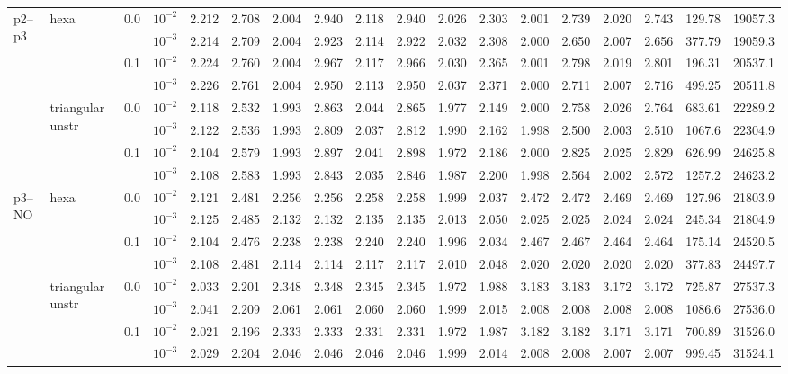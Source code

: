 \begin{longtable}{llclrrrrrrrrrrrrrr}
\multirow{8}{*}{p2--p3} & \multirow{4}{*}{hexa} & \multirow{2}{*}{0.0} & $10^{-2}$ & 2.212 & 2.708 & 2.004 & 2.940 & 2.118 & 2.940 & 2.026 & 2.303 & 2.001 & 2.739 & 2.020 & 2.743 & 129.78 & 19057.3 \\
& & & $10^{-3}$ & 2.214 & 2.709 & 2.004 & 2.923 & 2.114 & 2.922 & 2.032 & 2.308 & 2.000 & 2.650 & 2.007 & 2.656 & 377.79 & 19059.3 \\\cline{3-18}
& & \multirow{2}{*}{0.1} & $10^{-2}$ & 2.224 & 2.760 & 2.004 & 2.967 & 2.117 & 2.966 & 2.030 & 2.365 & 2.001 & 2.798 & 2.019 & 2.801 & 196.31 & 20537.1 \\
& & & $10^{-3}$ & 2.226 & 2.761 & 2.004 & 2.950 & 2.113 & 2.950 & 2.037 & 2.371 & 2.000 & 2.711 & 2.007 & 2.716 & 499.25 & 20511.8 \\\cline{2-18}
& \multirow{4}{*}{triangular unstr} & \multirow{2}{*}{0.0} & $10^{-2}$ & 2.118 & 2.532 & 1.993 & 2.863 & 2.044 & 2.865 & 1.977 & 2.149 & 2.000 & 2.758 & 2.026 & 2.764 & 683.61 & 22289.2 \\
& & & $10^{-3}$ & 2.122 & 2.536 & 1.993 & 2.809 & 2.037 & 2.812 & 1.990 & 2.162 & 1.998 & 2.500 & 2.003 & 2.510 & 1067.6 & 22304.9 \\\cline{3-18}
& & \multirow{2}{*}{0.1} & $10^{-2}$ & 2.104 & 2.579 & 1.993 & 2.897 & 2.041 & 2.898 & 1.972 & 2.186 & 2.000 & 2.825 & 2.025 & 2.829 & 626.99 & 24625.8 \\
& & & $10^{-3}$ & 2.108 & 2.583 & 1.993 & 2.843 & 2.035 & 2.846 & 1.987 & 2.200 & 1.998 & 2.564 & 2.002 & 2.572 & 1257.2 & 24623.2 \\\hline

\multirow{8}{*}{p3--NO} & \multirow{4}{*}{hexa} & \multirow{2}{*}{0.0} & $10^{-2}$ & 2.121 & 2.481 & 2.256 & 2.256 & 2.258 & 2.258 & 1.999 & 2.037 & 2.472 & 2.472 & 2.469 & 2.469 & 127.96 & 21803.9 \\
& & & $10^{-3}$ & 2.125 & 2.485 & 2.132 & 2.132 & 2.135 & 2.135 & 2.013 & 2.050 & 2.025 & 2.025 & 2.024 & 2.024 & 245.34 & 21804.9 \\\cline{3-18}
& & \multirow{2}{*}{0.1} & $10^{-2}$ & 2.104 & 2.476 & 2.238 & 2.238 & 2.240 & 2.240 & 1.996 & 2.034 & 2.467 & 2.467 & 2.464 & 2.464 & 175.14 & 24520.5 \\
& & & $10^{-3}$ & 2.108 & 2.481 & 2.114 & 2.114 & 2.117 & 2.117 & 2.010 & 2.048 & 2.020 & 2.020 & 2.020 & 2.020 & 377.83 & 24497.7 \\\cline{2-18}
& \multirow{4}{*}{triangular unstr} & \multirow{2}{*}{0.0} & $10^{-2}$ & 2.033 & 2.201 & 2.348 & 2.348 & 2.345 & 2.345 & 1.972 & 1.988 & 3.183 & 3.183 & 3.172 & 3.172 & 725.87 & 27537.3 \\
& & & $10^{-3}$ & 2.041 & 2.209 & 2.061 & 2.061 & 2.060 & 2.060 & 1.999 & 2.015 & 2.008 & 2.008 & 2.008 & 2.008 & 1086.6 & 27536.0 \\\cline{3-18}
& & \multirow{2}{*}{0.1} & $10^{-2}$ & 2.021 & 2.196 & 2.333 & 2.333 & 2.331 & 2.331 & 1.972 & 1.987 & 3.182 & 3.182 & 3.171 & 3.171 & 700.89 & 31526.0 \\
& & & $10^{-3}$ & 2.029 & 2.204 & 2.046 & 2.046 & 2.046 & 2.046 & 1.999 & 2.014 & 2.008 & 2.008 & 2.007 & 2.007 & 999.45 & 31524.1 \\\hline


\end{longtable}
